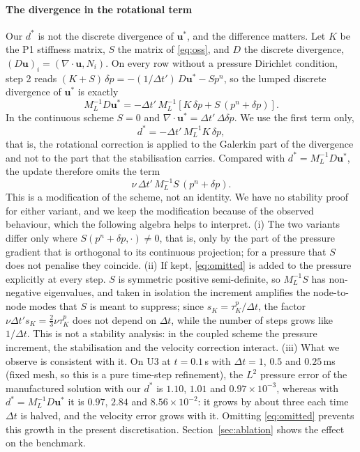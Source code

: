 \documentclass[preprint,12pt,number]{elsarticle}
\newcommand{\bu}{\mathbf{u}}
\newcommand{\dt}{\Delta t}
\begin{document}
\paragraph{The divergence in the rotational term}
Our $d^*$ is not the discrete divergence of $\bu^*$, and the difference matters. Let $K$ be the
P1 stiffness matrix, $S$ the matrix of \eqref{eq:oss}, and $D$ the discrete divergence,
$(D\bu)_i = (\nabla\cdot\bu, N_i)$. On every row without a pressure Dirichlet condition, step 2
reads $(K + S)\,\delta p = -(1/\dt')\,D\bu^* - S p^n$, so the lumped discrete divergence of
$\bu^*$ is exactly
\begin{equation}
M_L^{-1} D\bu^* = -\dt'\, M_L^{-1}\left[K\,\delta p + S\,(p^n + \delta p)\right].
\label{eq:divustar}
\end{equation}
In the continuous scheme $S = 0$ and $\nabla\cdot\bu^* = \dt'\,\Delta\delta p$. We use
the first term only,
\[
d^* = -\dt'\, M_L^{-1} K\,\delta p ,
\]
that is, the rotational correction is applied to the Galerkin part of the divergence and not to
the part that the stabilisation carries. Compared with $d^* = M_L^{-1} D\bu^*$, the update
therefore omits the term
\begin{equation}
\nu\,\dt'\,M_L^{-1} S\,(p^n + \delta p).
\label{eq:omitted}
\end{equation}
This is a modification of the scheme, not an identity. We have no stability proof for either
variant, and we keep the modification because of the observed behaviour, which the following
algebra helps to interpret. (i) The two variants differ only where $S(p^n+\delta p,\cdot)
\ne 0$, that is, only by the part of the pressure gradient that is orthogonal to its continuous
projection; for a pressure that $S$ does not penalise they coincide. (ii) If kept,
\eqref{eq:omitted} is added to the pressure explicitly at every step. $S$ is symmetric positive
semi-definite, so $M_L^{-1}S$ has non-negative eigenvalues, and taken in isolation the increment
amplifies the node-to-node modes that $S$ is meant to suppress; since $s_K = \tau^p_K/\dt$, the
factor $\nu\dt' s_K = \tfrac23\nu\tau^p_K$ does not depend on $\dt$, while the number of steps
grows like $1/\dt$. This is not a stability analysis: in the coupled scheme the pressure
increment, the stabilisation and the velocity correction interact. (iii) What we observe is
consistent with it. On U3 at $t = 0.1\,$s with $\dt = 1$, $0.5$ and $0.25\,$ms (fixed mesh, so
this is a pure time-step refinement), the $L^2$ pressure error of the manufactured solution with
our $d^*$ is $1.10$, $1.01$ and $0.97\times10^{-3}$, whereas with $d^* = M_L^{-1}D\bu^*$ it is
$0.97$, $2.84$ and $8.56\times10^{-2}$: it grows by about three each time $\dt$ is halved, and the
velocity error grows with it. Omitting \eqref{eq:omitted} prevents this growth in the present
discretisation. Section~\ref{sec:ablation} shows the effect on the benchmark.
\end{document}
